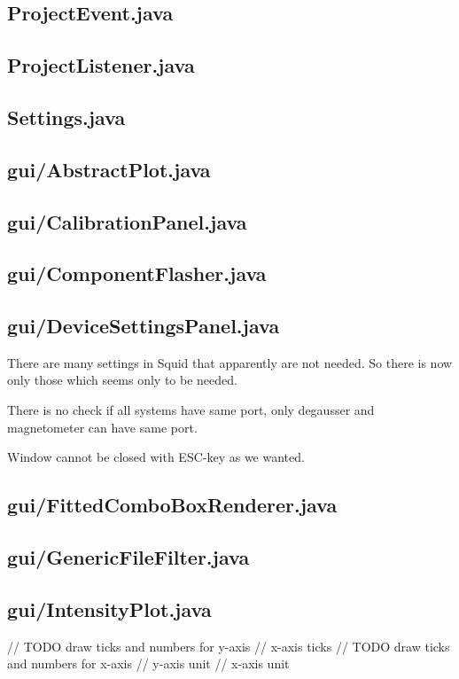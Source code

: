 \subsection{ProjectEvent.java}

\subsection{ProjectListener.java}

\subsection{Settings.java}

\subsection{gui/AbstractPlot.java}

\subsection{gui/CalibrationPanel.java}

\subsection{gui/ComponentFlasher.java}

\subsection{gui/DeviceSettingsPanel.java}

There are many settings in Squid that apparently are not needed. So there is now only those which seems only to be needed.

There is no check if all systems have same port, only degausser and magnetometer can have same port.

Window cannot be closed with ESC-key as we wanted.

\subsection{gui/FittedComboBoxRenderer.java}

\subsection{gui/GenericFileFilter.java}

\subsection{gui/IntensityPlot.java}
        // TODO draw ticks and numbers for y-axis
        // x-axis ticks
        // TODO draw ticks and numbers for x-axis
        // y-axis unit
        // x-axis unit

